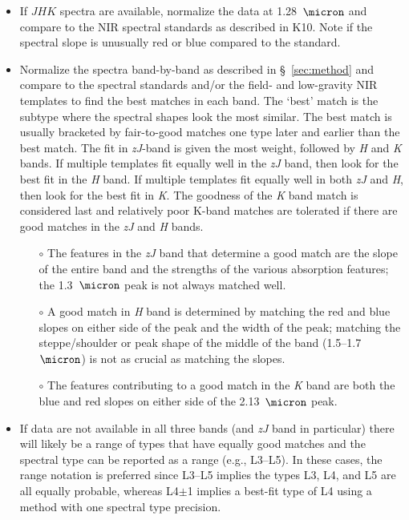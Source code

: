 \documentclass[modern,trackchanges]{aastex61}
\begin{document}
\begin{itemize}
	\item If $JHK$ spectra are available, normalize the data at 1.28~$\micron$ and compare to the NIR spectral standards as described in K10. Note if the spectral slope is unusually red or blue compared to the standard.

	\item Normalize the spectra band-by-band as described in \S~\ref{sec:method} and compare to the spectral standards and/or the field- and low-gravity NIR templates to find the best matches in each band.
	The `best' match is the subtype where the spectral shapes look the most similar. The best match is usually bracketed by fair-to-good matches one type later and earlier than the best match.
	The fit in \emph{zJ}-band is given the most weight, followed by \emph{H} and \emph{K} bands.
	If multiple templates fit equally well in the \emph{zJ} band, then look for the best fit in the \emph{H} band.
	If multiple templates fit equally well in both \emph{zJ} and \emph{H}, then look for the best fit in \emph{K}.
	The goodness of the \emph{K} band match is considered last and relatively poor K-band matches are tolerated if there are good matches in the \emph{zJ} and \emph{H} bands.
	\begin{itemize}
		\item[$\circ$] The features in the \emph{zJ} band that determine a good match are the slope of the entire band and the strengths of the various absorption features; the 1.3~$\micron$ peak is not always matched well.
		\item[$\circ$] A good match in \emph{H} band is determined by matching the red and blue slopes on either side of the peak and the width of the peak; matching the steppe/shoulder or peak shape of the middle of the band (1.5--1.7~$\micron$) is not as crucial as matching the slopes.
		\item[$\circ$] The features contributing to a good match in the \emph{K} band are both the blue and red slopes on either side of the 2.13~$\micron$ peak.
	\end{itemize}
	\item If data are not available in all three bands (and \emph{zJ} band in particular) there will likely be a range of types that have equally good matches and the spectral type can be reported as a range (e.g., L3--L5). In these cases, the range notation is preferred since L3--L5 implies the types L3, L4, and L5 are all equally probable, whereas L4$\pm$1 implies a best-fit type of L4 using a method with one spectral type precision.

\end{itemize}
\end{document}
